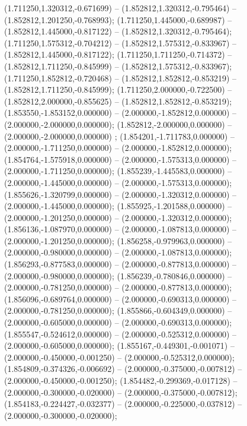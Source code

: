  (1.711250,1.320312,-0.671699) -- (1.852812,1.320312,-0.795464) -- (1.852812,1.201250,-0.768993);
 (1.711250,1.445000,-0.689987) -- (1.852812,1.445000,-0.817122) -- (1.852812,1.320312,-0.795464);
 (1.711250,1.575312,-0.704212) -- (1.852812,1.575312,-0.833967) -- (1.852812,1.445000,-0.817122);
 (1.711250,1.711250,-0.714372) -- (1.852812,1.711250,-0.845999) -- (1.852812,1.575312,-0.833967);
 (1.711250,1.852812,-0.720468) -- (1.852812,1.852812,-0.853219) -- (1.852812,1.711250,-0.845999);
 (1.711250,2.000000,-0.722500) -- (1.852812,2.000000,-0.855625) -- (1.852812,1.852812,-0.853219);
 (1.853550,-1.853152,0.000000) -- (2.000000,-1.852812,0.000000) -- (2.000000,-2.000000,0.000000);
 (1.852812,-2.000000,0.000000) -- (2.000000,-2.000000,0.000000) ;
 (1.854201,-1.711783,0.000000) -- (2.000000,-1.711250,0.000000) -- (2.000000,-1.852812,0.000000);
 (1.854764,-1.575918,0.000000) -- (2.000000,-1.575313,0.000000) -- (2.000000,-1.711250,0.000000);
 (1.855239,-1.445583,0.000000) -- (2.000000,-1.445000,0.000000) -- (2.000000,-1.575313,0.000000);
 (1.855626,-1.320799,0.000000) -- (2.000000,-1.320312,0.000000) -- (2.000000,-1.445000,0.000000);
 (1.855925,-1.201588,0.000000) -- (2.000000,-1.201250,0.000000) -- (2.000000,-1.320312,0.000000);
 (1.856136,-1.087970,0.000000) -- (2.000000,-1.087813,0.000000) -- (2.000000,-1.201250,0.000000);
 (1.856258,-0.979963,0.000000) -- (2.000000,-0.980000,0.000000) -- (2.000000,-1.087813,0.000000);
 (1.856293,-0.877583,0.000000) -- (2.000000,-0.877813,0.000000) -- (2.000000,-0.980000,0.000000);
 (1.856239,-0.780846,0.000000) -- (2.000000,-0.781250,0.000000) -- (2.000000,-0.877813,0.000000);
 (1.856096,-0.689764,0.000000) -- (2.000000,-0.690313,0.000000) -- (2.000000,-0.781250,0.000000);
 (1.855866,-0.604349,0.000000) -- (2.000000,-0.605000,0.000000) -- (2.000000,-0.690313,0.000000);
 (1.855547,-0.524612,0.000000) -- (2.000000,-0.525312,0.000000) -- (2.000000,-0.605000,0.000000);
 (1.855167,-0.449301,-0.001071) -- (2.000000,-0.450000,-0.001250) -- (2.000000,-0.525312,0.000000);
 (1.854809,-0.374326,-0.006692) -- (2.000000,-0.375000,-0.007812) -- (2.000000,-0.450000,-0.001250);
 (1.854482,-0.299369,-0.017128) -- (2.000000,-0.300000,-0.020000) -- (2.000000,-0.375000,-0.007812);
 (1.854183,-0.224427,-0.032377) -- (2.000000,-0.225000,-0.037812) -- (2.000000,-0.300000,-0.020000);
